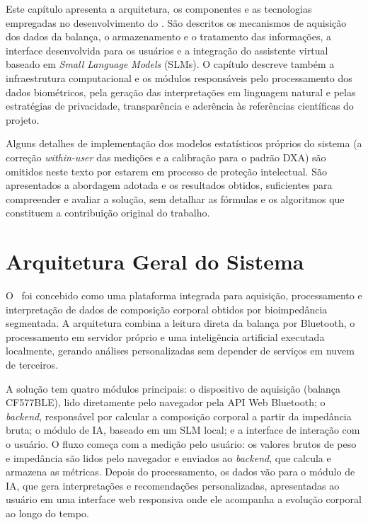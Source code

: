 Este capítulo apresenta a arquitetura, os componentes e as tecnologias empregadas no
desenvolvimento do \sintonia. São descritos os mecanismos de aquisição dos dados da
balança, o armazenamento e o tratamento das informações, a interface desenvolvida para os
usuários e a integração do assistente virtual baseado em \emph{Small Language Models}
(SLMs). O capítulo descreve também a infraestrutura computacional e os módulos responsáveis
pelo processamento dos dados biométricos, pela geração das interpretações em linguagem
natural e pelas estratégias de privacidade, transparência e aderência às referências
científicas do projeto.

Alguns detalhes de implementação dos modelos estatísticos próprios do sistema (a correção
\emph{within-user} das medições e a calibração para o padrão DXA) são omitidos neste texto por
estarem em processo de proteção intelectual. São apresentados a abordagem adotada e os
resultados obtidos, suficientes para compreender e avaliar a solução, sem detalhar as fórmulas
e os algoritmos que constituem a contribuição original do trabalho.

\section{Arquitetura Geral do Sistema}

O \sintonia\ foi concebido como uma plataforma integrada para aquisição, processamento e
interpretação de dados de composição corporal obtidos por bioimpedância segmentada. A
arquitetura combina a leitura direta da balança por Bluetooth, o processamento em servidor
próprio e uma inteligência artificial executada localmente, gerando análises
personalizadas sem depender de serviços em nuvem de terceiros.

A solução tem quatro módulos principais: o dispositivo de aquisição (balança CF577BLE),
lido diretamente pelo navegador pela API Web Bluetooth; o \emph{backend}, responsável por
calcular a composição corporal a partir da impedância bruta; o módulo de IA, baseado em um
SLM local; e a interface de interação com o usuário. O fluxo começa com a medição pelo
usuário: os valores brutos de peso e impedância são lidos pelo navegador e enviados ao
\emph{backend}, que calcula e armazena as métricas. Depois do processamento, os dados vão
para o módulo de IA, que gera interpretações e recomendações
personalizadas, apresentadas ao usuário em uma interface web responsiva onde ele acompanha
a evolução corporal ao longo do tempo.

